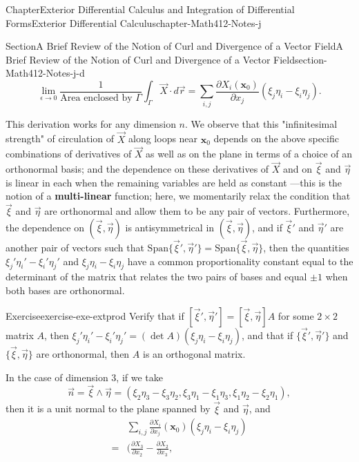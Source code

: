 \documentclass[oneside,10pt,]{book}
\newcommand{\terminology}[1]{\textbf{#1}}
\numberwithin{equation}{section}
\newcommand{\amp}{&}
\begin{document}
\begin{chapterptx}{Chapter}{Exterior Differential Calculus and Integration of Differential Forms}{}{Exterior Differential Calculus}{}{}{chapter-Math412-Notes-j}
\begin{sectionptx}{Section}{A Brief Review of the Notion of Curl and Divergence of a Vector Field}{}{A Brief Review of the Notion of Curl and Divergence of a Vector Field}{}{}{section-Math412-Notes-j-d}
\begin{equation*}
\lim_{\epsilon\to 0}\frac{1}{\text{Area enclosed by } \Gamma} \int_{\Gamma} \vec{X}\cdot d\vec{r}
=\sum_{i,j} \frac{\partial X_i({\mathbf x}_{0})}{\partial x_j} \left(\xi_j\eta_i - \xi_i\eta_j  \right).
\end{equation*}
%
\par
This derivation works for any dimension \(n\). We observe that this "infinitesimal strength" of circulation of \(\vec{X}\) along loops near \({\mathbf x}_{0}\) depends on the above specific combinations of derivatives of  \(\vec{X}\) as well as on the plane in terms of a choice of an orthonormal basis; and the dependence on these derivatives of  \(\vec{X}\) and on  \(\vec{\xi}\) and \(\vec{\eta}\) is linear in each when the remaining variables are held as constant\(\mbox{ ---}\)this is the notion of a \terminology{multi-linear} function; here, we momentarily relax the condition that \(\vec{\xi}\) and \(\vec{\eta}\) are orthonormal and allow them to be any pair of vectors.  Furthermore,  the dependence on \((\vec{\xi}, \vec{\eta})\) is antisymmetrical in \((\vec{\xi}, \vec{\eta})\), and if \(\vec{\xi}'\) and \(\vec{\eta}'\) are another pair of vectors such that \(\text{Span}\{ \vec{\xi}',\vec{\eta}'\} = \text{Span}\{ \vec{\xi},\vec{\eta}\}\), then the quantities \(\xi_j'\eta_i' - \xi_i'\eta_j' \) and \(\xi_j\eta_i - \xi_i\eta_j \) have a common proportionality constant equal to the determinant of the matrix that relates the two pairs of bases and equal \(\pm 1\) when both bases are orthonormal.%
\begin{inlineexercise}{Exercise}{}{exercise-exe-extprod}%
Verify that if \([\vec{\xi}',\vec{\eta}']=[\vec{\xi},\vec{\eta}]A\) for some \(2\times 2\) matrix \(A\), then \(\xi_j'\eta_i' - \xi_i'\eta_j'=(\det A)(\xi_j\eta_i - \xi_i\eta_j) \), and that if \(\{ \vec{\xi}',\vec{\eta}'\}\) and \(\{ \vec{\xi},\vec{\eta}\}\) are orthonormal, then \(A\) is an orthogonal matrix.%
\end{inlineexercise}%
In the case of dimension \(3\), if we take%
\begin{equation*}
\vec{n}=\vec{\xi}\wedge\vec{\eta}=(\xi_2\eta_3-\xi_3\eta_2, \xi_3\eta_1-\xi_1\eta_3, \xi_1\eta_2-\xi_2\eta_1),
\end{equation*}
then it is a unit normal to the plane spanned by \(\vec{\xi}\) and \(\vec{\eta}\), and%
\begin{align*}
\amp \sum_{i,j} \frac{\partial X_i}{\partial x_j} ({\mathbf x}_{0})
\left(\xi_j\eta_i - \xi_i\eta_j  \right)\\
=\amp (\frac{\partial X_3}{\partial x_2}-\frac{\partial X_2}{\partial x_3},

\end{align*}
\end{sectionptx}
\end{chapterptx}
\end{document}
